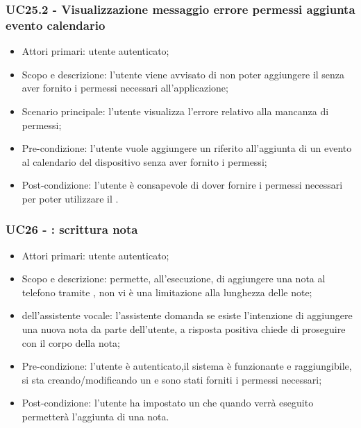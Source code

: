 \subsubsection{UC25.2 - Visualizzazione messaggio errore permessi aggiunta evento calendario}
\begin{itemize}
	\item  Attori primari: utente autenticato;
	\item  Scopo e descrizione: l'utente viene avvisato di non poter aggiungere il  senza aver fornito i permessi necessari all'applicazione;
	\item  Scenario principale: l'utente visualizza l'errore relativo alla mancanza di permessi;
	\item  Pre-condizione: l'utente vuole aggiungere un  riferito all'aggiunta di un evento al calendario del dispositivo  senza aver fornito i permessi;
	\item  Post-condizione: l'utente è consapevole di dover fornire i permessi necessari per poter utilizzare il .
\end{itemize}
\subsubsection{UC26 - : scrittura nota}
\begin{itemize}
	\item  Attori primari: utente autenticato;
	\item  Scopo e descrizione: permette, all'esecuzione, di aggiungere una nota al telefono tramite , non vi è una limitazione alla lunghezza delle note;
	\item  {} dell'assistente vocale: l'assistente domanda se esiste l'intenzione di aggiungere una nuova nota da parte dell'utente, a risposta positiva chiede di proseguire con il corpo della nota;
	\item  Pre-condizione: l'utente è autenticato,il sistema è funzionante e raggiungibile, si sta creando/modificando un  e sono stati forniti i permessi necessari;
	\item  Post-condizione: l'utente ha impostato un  che quando verrà eseguito permetterà l'aggiunta di una nota.
\end{itemize}

